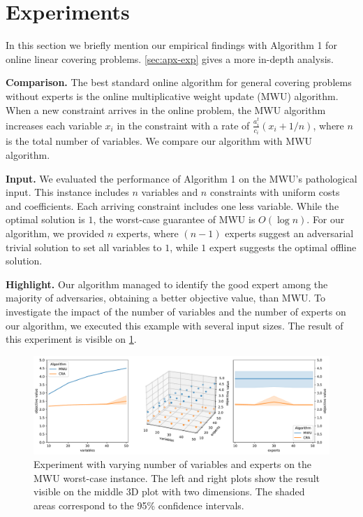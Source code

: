 
\section{Experiments} \label{sec:exp}

In this section we briefly mention our empirical findings with Algorithm  1 for online linear covering problems. \cref{sec:apx-exp} gives a more in-depth analysis.

\textbf{Comparison.} The best standard online algorithm for general covering problems without experts is the online multiplicative weight update (MWU) algorithm. When a new constraint arrives in the online problem, the MWU algorithm increases each variable $x_i$ in the constraint with a rate of $\frac{a^t_i}{c_i}(x_i + 1/n)$, where $n$ is the total number of variables. We compare our algorithm with MWU algorithm.

\textbf{Input.} We evaluated the performance of Algorithm 1 on the MWU's pathological input. This instance includes $n$ variables and $n$ constraints with uniform costs and coefficients. Each arriving constraint includes one less variable. While the optimal solution is $1$, the worst-case guarantee of MWU is $O(\log n)$. For our algorithm, we provided $n$ experts, where $(n-1)$ experts suggest an adversarial trivial solution to set all variables to $1$, while $1$ expert suggests the optimal offline solution. 

\textbf{Highlight.} Our algorithm managed to identify the good expert among the majority of adversaries, obtaining a better objective value, than MWU. To investigate the impact of the number of variables and the number of experts on our algorithm, we executed this example with several input sizes. The result of this experiment is visible on \cref{fig:exp-3d}.

\begin{figure}[!ht]
    \centering
    \includegraphics[width=\linewidth]{./Img/worst_case_figure.pdf}
    \caption{Experiment with varying number of variables and experts on the MWU worst-case instance. The left and right plots show the result visible on the middle 3D plot with two dimensions. The shaded areas correspond to the 95\% confidence intervals.}
    \label{fig:exp-3d}
\end{figure}
